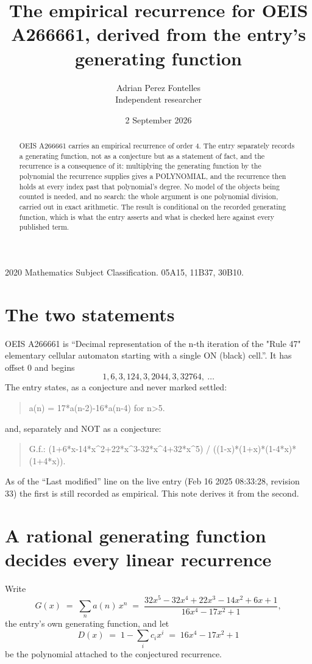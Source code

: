 \documentclass[11pt,a4paper]{article}
\title{The empirical recurrence for OEIS A266661, derived from the entry's generating function}
\author{Adrian Perez Fontelles\\ \small Independent researcher}
\date{2 September 2026}
\theoremstyle{plain}
\theoremstyle{definition}
\begin{document}
\maketitle

\begin{abstract}
OEIS A266661 carries an empirical recurrence of order $4$. The entry separately records a
generating function, not as a conjecture but as a statement of fact, and the recurrence is a
consequence of it: multiplying the generating function by the polynomial the recurrence
supplies gives a POLYNOMIAL, and the recurrence then holds at every index past that
polynomial's degree. No model of the objects being counted is needed, and no search: the
whole argument is one polynomial division, carried out in exact arithmetic. The result is
conditional on the recorded generating function, which is what the entry asserts and what is
checked here against every published term.
\end{abstract}

\noindent\small 2020 Mathematics Subject Classification. 05A15, 11B37, 30B10.\normalsize

\section{The two statements}

OEIS A266661 is ``Decimal representation of the n-th iteration of the "Rule 47" elementary cellular automaton starting with a single ON (black) cell.''. It has offset $0$ and begins
\[
1, 6, 3, 124, 3, 2044, 3, 32764,\ \dots
\]
The entry states, as a conjecture and never marked settled:
\begin{quote}
a(n) = 17*a(n-2)-16*a(n-4) for n>5.
\end{quote}
and, separately and NOT as a conjecture:
\begin{quote}
G.f.: (1+6*x-14*x\^{}2+22*x\^{}3-32*x\^{}4+32*x\^{}5) / ((1-x)*(1+x)*(1-4*x)*(1+4*x)).
\end{quote}
As of the ``Last modified'' line on the live entry (Feb 16 2025 08:33:28, revision 33) the first is still
recorded as empirical. This note derives it from the second.

\section{A rational generating function decides every linear recurrence}

Write
\[
G(x)\;=\;\sum_{n}a(n)\,x^{n}\;=\;\frac{32 x^{5} - 32 x^{4} + 22 x^{3} - 14 x^{2} + 6 x + 1}{16 x^{4} - 17 x^{2} + 1},
\]
the entry's own generating function, and let
\[
D(x)\;=\;1-\sum_i c_i x^{i}\;=\;16 x^{4} - 17 x^{2} + 1
\]
be the polynomial attached to the conjectured recurrence.
\end{document}
